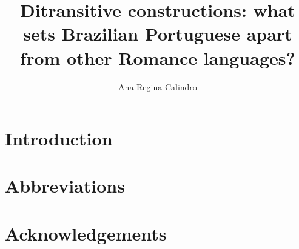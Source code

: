\documentclass[output=paper]{langsci/langscibook}
\author{Ana Regina Calindro\affiliation{}}
\title{Ditransitive constructions: what sets Brazilian Portuguese apart from other Romance languages?}
\begin{document}
\section{Introduction}  
 
\section*{Abbreviations}
\section*{Acknowledgements}

\sloppy
\printbibliography[heading=subbibliography,notkeyword=this] 
\end{document}
